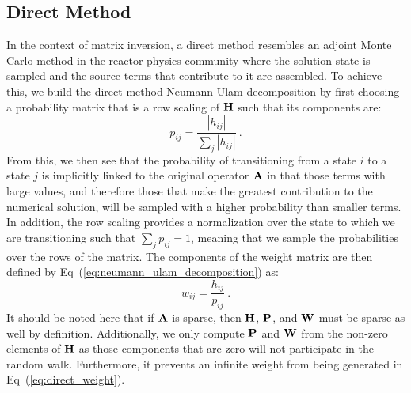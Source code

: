 \subsection{Direct Method}
\label{subsec:direct_mc}
In the context of matrix inversion, a direct method resembles an
adjoint Monte Carlo method in the reactor physics community where the
solution state is sampled and the source terms that contribute to it
are assembled. To achieve this, we build the direct method
Neumann-Ulam decomposition by first choosing a probability matrix that
is a row scaling of $\mathbf{H}$ such that its components are:
\begin{equation}
  p_{ij} = \frac{|h_{ij}|}{\sum_j |h_{ij}|}\:.
  \label{eq:direct_probability}
\end{equation}
From this, we then see that the probability of transitioning from a
state $i$ to a state $j$ is implicitly linked to the original operator
$\mathbf{A}$ in that those terms with large values, and therefore those
that make the greatest contribution to the numerical solution, will be
sampled with a higher probability than smaller terms. In addition, the
row scaling provides a normalization over the state to which we are
transitioning such that $\sum_j p_{ij} = 1$, meaning that we sample
the probabilities over the rows of the matrix. The components of
the weight matrix are then defined by
Eq~(\ref{eq:neumann_ulam_decomposition}) as:
\begin{equation}
  w_{ij} = \frac{h_{ij}}{p_{ij}}\:.
  \label{eq:direct_weight}
\end{equation}
It should be noted here that if $\mathbf{A}$ is sparse, then $\mathbf{H}$,
$\mathbf{P}$, and $\mathbf{W}$ must be sparse as well by
definition. Additionally, we only compute $\mathbf{P}$ and $\mathbf{W}$ from
the non-zero elements of $\mathbf{H}$ as those components that are zero
will not participate in the random walk. Furthermore, it prevents an
infinite weight from being generated in Eq~(\ref{eq:direct_weight}).


